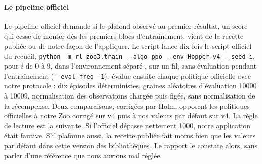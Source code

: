 \paragraph{Le pipeline officiel}
Le pipeline officiel demande si le plafond observé au premier
résultat, un score qui cesse de monter dès les premiers blocs d'entraînement, vient de la recette publiée ou de
notre façon de l'appliquer. Le script  lance dix fois le
script officiel du recueil, \texttt{python -m rl\_zoo3.train -{}-algo ppo -{}-env Hopper-v4 -{}-seed i}, pour
$i$ de 0 à 9, dans l'environnement séparé , sur un fil, sans évaluation pendant
l'entraînement (\texttt{-{}-eval-freq -1}).  évalue ensuite chaque politique officielle
avec notre protocole : dix épisodes déterministes, graines aléatoires d'évaluation \num{10000} à \num{10009},
normalisation des observations chargée puis figée, sans normalisation de la récompense. Deux comparaisons,
corrigées par Holm, opposent les politiques officielles à notre Zoo corrigé sur v4 puis à
nos valeurs par défaut sur v4. La règle de lecture est la suivante. Si l'officiel dépasse nettement \num{1000},
notre application était fautive. S'il plafonne aussi, la recette publiée fait moins bien que les valeurs par
défaut dans cette version des bibliothèques. Le rapport le constate alors, sans parler d'une
référence que nous aurions mal réglée.

